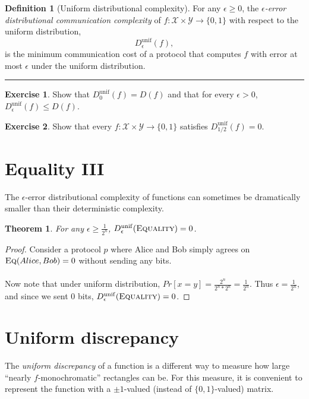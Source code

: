 \documentclass[11pt,oneside]{book}
\theoremstyle{plain}
\newtheorem{theorem}{Theorem}
\theoremstyle{definition}
\newtheorem{definition}{Definition}
\newtheorem{exercise}{Exercise}
\theoremstyle{plain}
\newcommand{\Eq}{\textsc{Eq}}
\newcommand{\exercises}{\bigskip \noindent\rule{8cm}{0.4pt} \medskip}
\begin{document}
\begin{definition}[Uniform distributional complexity]
	For any $\epsilon \ge 0$, the \emph{$\epsilon$-error distributional communication complexity} of $f : \mathcal{X} \times \mathcal{Y} \to \{0,1\}$ with respect to the uniform distribution,
	\[
	D_\epsilon^{\mathrm{unif}}(f),
	\]
	is the minimum communication cost of a protocol that computes $f$ with error at most $\epsilon$ under the uniform distribution.
\end{definition}

\exercises

\begin{exercise}
	Show that $D_0^{\mathrm{unif}}(f) = D(f)$ and that for every $\epsilon > 0$, 
	$D_\epsilon^{\mathrm{unif}}(f) \le D(f)$.
\end{exercise}

\begin{exercise}
	Show that every $f : \mathcal{X} \times \mathcal{Y} \to \{0,1\}$ satisfies
	$D_{1/2}^{\mathrm{unif}}(f) = 0$.
\end{exercise}


\section{Equality III}

The $\epsilon$-error distributional complexity of functions can sometimes be dramatically smaller than their deterministic complexity.

\begin{theorem}
	For any $\epsilon \ge \frac1{2^n}$, $D_\epsilon^{\mathrm{unif}}(\textsc{Equality}) = 0$.
\end{theorem}

\begin{proof}
	Consider a protocol $p$ where Alice and Bob simply agrees on $\Eq (Alice,Bob) = 0$ without sending any bits. \\
	\\
	Now note that under uniform distribution, $Pr[x=y] = \frac{2^n}{2^n*2^n} = \frac{1}{2^n}$. Thus $\epsilon = \frac{1}{2^n}$, and since we sent 0 bits, $D_\epsilon^{\mathrm{unif}}(\textsc{Equality}) = 0$.
\end{proof}


 \section{Uniform discrepancy}

The \emph{uniform discrepancy} of a function is a different way to measure how large ``nearly $f$-monochromatic'' rectangles can be. For this measure, it is convenient to represent the function with a $\pm1$-valued (instead of $\{0,1\}$-valued) matrix.
\end{document}
